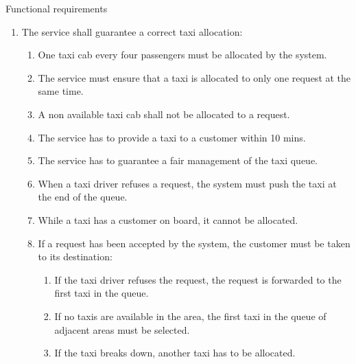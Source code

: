 \begin{frame}[allowframebreaks]{Functional requirements}
\begin{enumerate}
	\item The service shall guarantee a correct taxi allocation: \begin{enumerate}
		\item One taxi cab every four passengers must be allocated by the system.
		\item The service must ensure that a taxi is allocated to only one request at the same time.
		\item A non available taxi cab shall not be allocated to a request.
		\item The service has to provide a taxi to a customer within 10 mins.
		\item The service has to guarantee a fair management of the taxi queue.
		\item When a taxi driver refuses a request, the system must push the taxi at the end of the queue.
		\item While a taxi has a customer on board, it cannot be allocated.
		\item If a request has been accepted by the system, the customer must be taken to its destination: \begin{enumerate}
			\item If the taxi driver refuses the request, the request is forwarded to the first taxi in the queue.
			\item If no taxis are available in the area, the first taxi in the queue of adjacent areas must be selected.
			\item If the taxi breaks down, another taxi has to be allocated.
		\end{enumerate}
	\end{enumerate}
 
\end{enumerate}
\end{frame}
